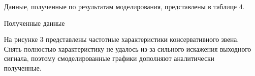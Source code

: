 \documentclass[a4paper, 11pt]{article}
\begin{document}
\par 
Данные, полученные по результатам моделирования, представлены в таблице 4.

\newpage
\begin{table}[h!]
\centering
    \begin{threeparttable}
        \caption{Полученные данные} \label{tab:perflogcross}
    \end{threeparttable}
\end{table}

\newpage
\par 
На рисунке 3 представлены частотные характеристики консервативного звена. Снять полностью характеристику не удалось из-за сильного искажения выходного сигнала, поэтому смоделированные графики дополняют аналитически полученные.
\end{document}
